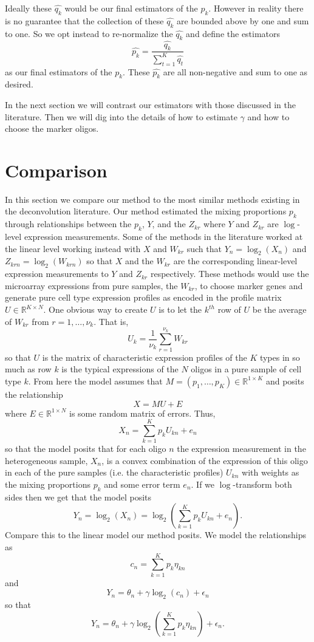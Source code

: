 \documentclass[reqno,12pt,oneside]{report}\usepackage[]{graphicx}\usepackage[]{color}
\theoremstyle{plain}
\theoremstyle{definition}
\theoremstyle{remark}
\numberwithin{theorem}{chapter}     %
\begin{document}
Ideally these $\widehat{q_k}$ would be our final estimators of the $p_k$. However in reality there is no guarantee that the collection of these $\widehat{q_k}$ are bounded above by one and sum to one. So we opt instead to re-normalize the $\widehat{q_k}$ and define the estimators
\[
\widehat{p_k} = \frac{\widehat{q_k}}{\sum_{t=1}^{K}\widehat{q_t}}
\]
as our final estimators of the $p_k$. These $\widehat{p_k}$ are all non-negative and sum to one as desired. 

In the next section we will contrast our estimators with those discussed in the literature. Then we will dig into the details of how to estimate $\gamma$ and how to choose the marker oligos.

\section{Comparison}

In this section we compare our method to the most similar methods existing in the deconvolution literature. Our method estimated the mixing proportions $p_k$ through relationships between the $p_k$, $Y$, and the $Z_{kr}$ where $Y$ and $Z_{kr}$ are $\log$-level expression measurements. Some of the methods in the literature worked at the linear level working instead with $X$ and $W_{kr}$ such that $Y_n = \log_2(X_n)$ and $Z_{krn}=\log_2(W_{krn})$ so that $X$ and the $W_{kr}$ are the corresponding linear-level expression measurements to $Y$ and $Z_{kr}$ respectively. These methods would use the microarray expressions from pure samples, the $W_{kr}$, to choose marker genes and generate pure cell type expression profiles as encoded in the profile matrix $U\in\mathbb{R}^{K\times N}$. One obvious way to create $U$ is to let the $k^{th}$ row of $U$ be the average of $W_{kr}$ from $r=1,\ldots,\nu_k$. That is,
\[
U_k = \frac{1}{\nu_k} \sum_{r=1}^{\nu_k}W_{kr}
\]
so that $U$ is the matrix of characteristic expression profiles of the $K$ types in so much as row $k$ is the typical expressions of the $N$ oligos in a pure sample of cell type $k$. 
From here the model assumes that $M=(p_1,\ldots,p_K) \in \mathbb{R}^{1\times K}$ and posits the relationship
\[
X = MU + E
\]
where $E\in\mathbb{R}^{1\times N}$ is some random matrix of errors. Thus, 
\[
X_n = \sum_{k=1}^{K}p_kU_{kn}+e_{n}
\]
so that the model posits that for each oligo $n$ the expression measurement in the heterogeneous sample, $X_n$, is a convex combination of the expression of this oligo in each of the pure samples (i.e. the characteristic profiles) $U_{kn}$ with weights as the mixing proportions $p_k$ and some error term $e_n$. If we $\log$-transform both sides then we get that the model posits
\begin{equation}
\label{eqn:complit}
Y_n = \log_2\left(X_n\right) = \log_2\left(\sum_{k=1}^{K}p_kU_{kn}+e_{n}\right).
\end{equation}
Compare this to the linear model our method posits. We model the relationships as 
\[
c_n = \sum_{k=1}^{K}p_k\eta_{kn}
\]
and 
\[
Y_n = \theta_n + \gamma\log_2\left(c_n\right)+\epsilon_n
\]
so that
\begin{equation}
\label{eqn:compours}
Y_n = \theta_n + \gamma\log_2\left(\sum_{k=1}^{K}p_k\eta_{kn}\right)+\epsilon_n.
\end{equation}
\end{document}
